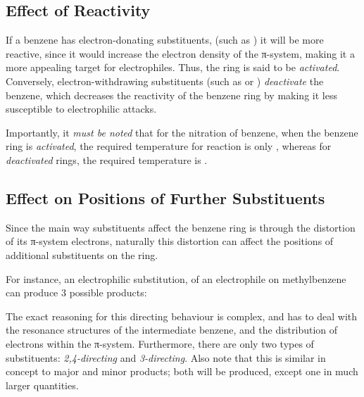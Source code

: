 			\subsection{Effect of Reactivity}

				If a benzene has electron-donating substituents, (such as ) it will be more reactive, since it would increase
				the electron density of the π-system, making it a more appealing target for electrophiles. Thus, the ring is said to
				be \textit{activated}. Conversely, electron-withdrawing substituents (such as  or ) \textit{deactivate}
				the benzene, which decreases the reactivity of the benzene ring by making it less susceptible to electrophilic attacks.


				Importantly, it \textit{must be noted} that for the nitration of benzene, when the benzene ring is \textit{activated}, the
				required temperature for reaction is only , whereas for \textit{deactivated} rings, the required
				temperature is .


			\subsection{Effect on Positions of Further Substituents}

				Since the main way substituents affect the benzene ring is through the distortion of its π-system electrons, naturally
				this distortion can affect the positions of additional substituents on the ring.

				For instance, an electrophilic substitution, of an electrophile  on methylbenzene can produce 3 possible products:


			The exact reasoning for this directing behaviour is complex, and has to deal with the resonance structures of the intermediate
			benzene, and the distribution of electrons within the π-system. Furthermore, there are only two types of substituents:
			\textit{2,4-directing} and \textit{3-directing}. Also note that this is similar in concept to major and minor products; both
			will be produced, except one in much larger quantities.

